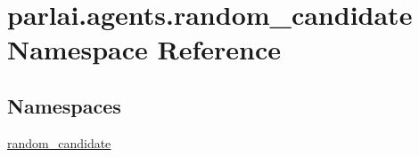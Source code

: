 \hypertarget{namespaceparlai_1_1agents_1_1random__candidate}{}\section{parlai.\+agents.\+random\+\_\+candidate Namespace Reference}
\label{namespaceparlai_1_1agents_1_1random__candidate}
\subsection*{Namespaces}
\begin{DoxyCompactItemize}
\item 
 \hyperlink{namespaceparlai_1_1agents_1_1random__candidate_1_1random__candidate}{random\+\_\+candidate}
\end{DoxyCompactItemize}

